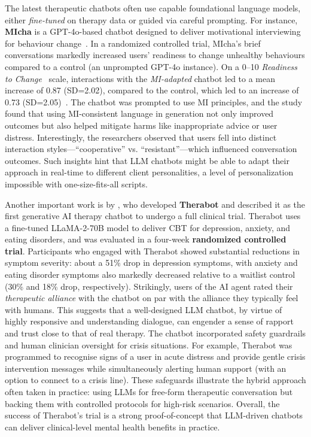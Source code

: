 The latest therapeutic chatbots often use capable foundational language models, either \emph{fine-tuned} on therapy data or guided via careful prompting. For instance, \textbf{MIcha} is a GPT-4o-based chatbot designed to deliver motivational interviewing for behaviour change~\cite{Meyer2025}. In a randomized controlled trial, MIcha's brief conversations markedly increased users' readiness to change unhealthy behaviours compared to a control (an unprompted GPT-4o instance). On a 0--10 \emph{Readiness to Change}~\cite{BienerAbrams1991} scale, interactions with the \emph{MI-adapted} chatbot led to a mean increase of 0.87 (SD=2.02), compared to the control, which led to an increase of 0.73 (SD=2.05)~\cite{Meyer2025}.
The chatbot was prompted to use MI principles, and the study found that using MI-consistent language in generation not only improved outcomes but also helped mitigate harms like inappropriate advice or user distress. Interestingly, the researchers observed that users fell into distinct interaction styles---``cooperative'' vs. ``resistant''---which influenced conversation outcomes. Such insights hint that LLM chatbots might be able to adapt their approach in real-time to different client personalities, a level of personalization impossible with one-size-fits-all scripts.

Another important work is by \citet{doi:10.1056/AIoa2400802}, who developed \textbf{Therabot} and described it as the first generative AI therapy chatbot to undergo a full clinical trial. Therabot uses a fine-tuned LLaMA-2-70B model to deliver CBT for depression, anxiety, and eating disorders, and was evaluated in a four-week \textbf{randomized controlled trial}. Participants who engaged with Therabot showed substantial reductions in symptom severity: about a 51\% drop in depression symptoms, with anxiety and eating disorder symptoms also markedly decreased relative to a waitlist control (30\% and 18\% drop, respectively). Strikingly, users of the AI agent rated their \emph{therapeutic alliance} with the chatbot on par with the alliance they typically feel with humans. This suggests that a well-designed LLM chatbot, by virtue of highly responsive and understanding dialogue, can engender a sense of rapport and trust close to that of real therapy. The chatbot incorporated safety guardrails and human clinician oversight for crisis situations. For example, Therabot was programmed to recognise signs of a user in acute distress and provide gentle crisis intervention messages while simultaneously alerting human support (with an option to connect to a crisis line). These safeguards illustrate the hybrid approach often taken in practice: using LLMs for free-form therapeutic conversation but backing them with controlled protocols for high-risk scenarios. Overall, the success of Therabot’s trial is a strong proof-of-concept that LLM-driven chatbots can deliver clinical-level mental health benefits in practice.

